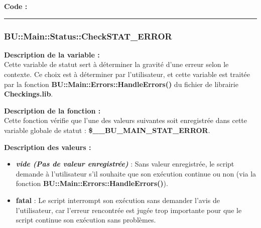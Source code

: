 \documentclass[a4paper,10pt]{article}
\begin{document}
\begin{justify}
    \textbf{Code :}
\end{justify}



\color{blue}\par\noindent\rule{\textwidth}{0.4pt}\color{white}

\color{blue}
\subsubsection{\color{mauve}BU::Main::Status::CheckSTAT\_ERROR}\color{white}

\begin{justify}
    \textbf{Description de la variable :}\\
    Cette variable de statut sert à déterminer la gravité d'une erreur selon le contexte. Ce choix est à déterminer par l'utilisateur, et cette variable est traitée par la fonction \textbf{\color{mauve}BU::Main::Errors::HandleErrors()} du fichier de librairie \textbf{\color{lime}Checkings.lib}.
\end{justify}

\begin{justify}
    \textbf{Description de la fonction :}\\
        Cette fonction vérifie que l'une des valeurs suivantes soit enregistrée dans cette variable globale de statut : \textbf{\color{orange}\$\_\_BU\_MAIN\_STAT\_ERROR}.
\end{justify}

\begin{justify}
    \textbf{Description des valeurs :}

    \begin{itemize}
        \item \textbf{\textit{vide (Pas de valeur enregistrée)}} : Sans valeur enregistrée, le script demande à l'utilisateur s'il souhaite que son exécution
        continue ou non (via la fonction \textbf{\color{mauve}BU::Main::Errors::HandleErrors()}).\\

        \item \textbf{fatal} : Le script interrompt son exécution sans demander l'avis de l'utilisateur, car l'erreur rencontrée est jugée trop importante pour que le script continue son exécution sans problèmes.
    \end{itemize}

\end{justify}
\end{document}
